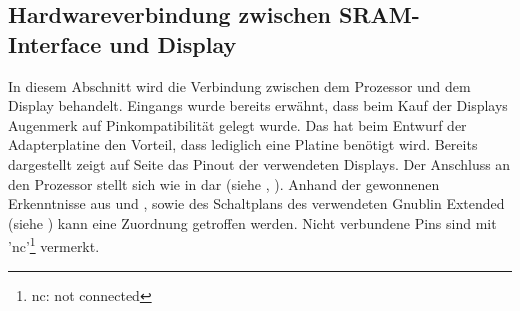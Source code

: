 \newpage
\subsection{Hardwareverbindung zwischen SRAM-Interface und Display}
In diesem Abschnitt wird die Verbindung zwischen dem Prozessor und dem Display behandelt. Eingangs wurde bereits erwähnt, dass beim Kauf der Displays Augenmerk auf Pinkompatibilität gelegt wurde. Das hat beim Entwurf der Adapterplatine den Vorteil, dass lediglich eine Platine benötigt wird. \newline
Bereits dargestellt zeigt  auf Seite \pageref{fig:8080_pinout} das Pinout der verwendeten Displays. Der Anschluss an den Prozessor stellt sich wie in  dar (siehe \cite{Coldtears2014}, \cite{EmbeddedProjects2013}). Anhand der gewonnenen Erkenntnisse aus  und , sowie des Schaltplans des verwendeten Gnublin Extended (siehe \cite{EmbeddedProjects2013}) kann eine Zuordnung getroffen werden. Nicht verbundene Pins sind mit 'nc'\footnote{nc: not connected} vermerkt.


